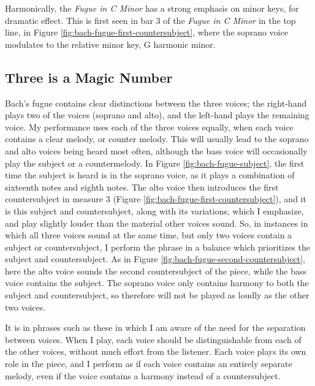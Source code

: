 Harmonically, the \textit{Fugue in C Minor} has a strong emphasis on minor keys, for dramatic effect. This is first seen in bar 3 of the \textit{Fugue in C Minor} in the top line, in Figure \ref{fig:bach-fugue-first-countersubject}\autocite{Henle_2009}, where the soprano voice modulates to the relative minor key, G harmonic minor. 

\subsection{Three is a Magic Number}

Bach's fugue contains clear distinctions between the three voices; the right-hand plays two of the voices (soprano and alto), and the left-hand plays the remaining voice. My performance uses each of the three voices equally, when each voice contains a clear melody, or counter melody. This will usually lead to the soprano and alto voices being heard most often, although the bass voice will occasionally play the subject or a countermelody. In Figure \ref{fig:bach-fugue-subject}\autocite{Henle_2009}, the first time the subject is heard is in the soprano voice, as it plays a combination of sixteenth notes and eighth notes. The alto voice then introduces the first countersubject in measure 3 (Figure \ref{fig:bach-fugue-first-countersubject}\autocite{Henle_2009}), and it is this subject and countersubject, along with its variations, which I emphasize, and play slightly louder than the material other voices sound. So, in instances in which all three voices sound at the same time, but only two voices contain a subject or countersubject, I perform the phrase in a balance which prioritizes the subject and countersubject. As in Figure \ref{fig:bach-fugue-second-countersubject}\autocite{Henle_2009}, here the alto voice sounds the second countersubject of the piece, while the bass voice contains the subject. The soprano voice only contains harmony to both the subject and countersubject, so therefore will not be played as loudly as the other two voices. 

It is in phrases such as these in which I am aware of the need for the separation between voices. When I play, each voice should be distinguishable from each of the other voices, without much effort from the listener. Each voice plays its own role in the piece, and I perform as if each voice contains an entirely separate melody, even if the voice contains a harmony instead of a countersubject. 

